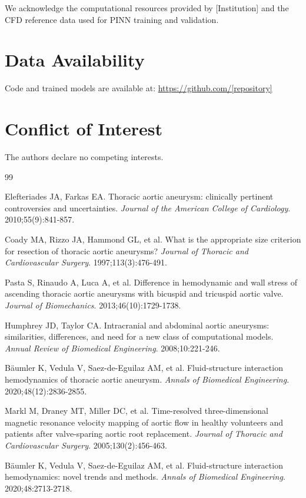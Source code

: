 \documentclass[11pt,a4paper]{article}
\begin{document}
We acknowledge the computational resources provided by [Institution] and the CFD reference data used for PINN training and validation.

\section*{Data Availability}

Code and trained models are available at: \url{https://github.com/[repository]}

\section*{Conflict of Interest}

The authors declare no competing interests.

\begin{thebibliography}{99}

 Elefteriades JA, Farkas EA. Thoracic aortic aneurysm: clinically pertinent controversies and uncertainties. \textit{Journal of the American College of Cardiology}. 2010;55(9):841-857.

 Coady MA, Rizzo JA, Hammond GL, et al. What is the appropriate size criterion for resection of thoracic aortic aneurysms? \textit{Journal of Thoracic and Cardiovascular Surgery}. 1997;113(3):476-491.

 Pasta S, Rinaudo A, Luca A, et al. Difference in hemodynamic and wall stress of ascending thoracic aortic aneurysms with bicuspid and tricuspid aortic valve. \textit{Journal of Biomechanics}. 2013;46(10):1729-1738.

 Humphrey JD, Taylor CA. Intracranial and abdominal aortic aneurysms: similarities, differences, and need for a new class of computational models. \textit{Annual Review of Biomedical Engineering}. 2008;10:221-246.

 B\"aumler K, Vedula V, Saez-de-Eguilaz AM, et al. Fluid-structure interaction hemodynamics of thoracic aortic aneurysm. \textit{Annals of Biomedical Engineering}. 2020;48(12):2836-2855.

 Markl M, Draney MT, Miller DC, et al. Time-resolved three-dimensional magnetic resonance velocity mapping of aortic flow in healthy volunteers and patients after valve-sparing aortic root replacement. \textit{Journal of Thoracic and Cardiovascular Surgery}. 2005;130(2):456-463.

 B\"aumler K, Vedula V, Saez-de-Eguilaz AM, et al. Fluid-structure interaction hemodynamics: novel trends and methods. \textit{Annals of Biomedical Engineering}. 2020;48:2713-2718.


\end{thebibliography}
\end{document}
